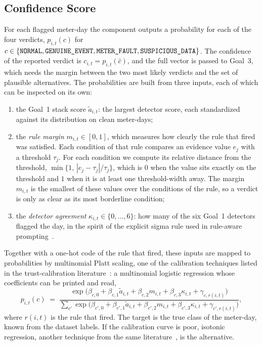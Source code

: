\subsection{Confidence Score}
\label{g2-sec:confidence}
For each flagged meter-day the component outputs a probability for each of the four verdicts,
$p_{i,t}(c)$ for $c\in\{\texttt{NORMAL},\texttt{GENUINE\_EVENT},\texttt{METER\_FAULT},\texttt{SUSPICIOUS\_DATA}\}$. The confidence of the reported verdict is
$c_{i,t}=p_{i,t}(\hat c)$, and the full vector is passed to Goal~3, which needs the margin between the two most
likely verdicts and the set of plausible alternatives. The probabilities are built from three inputs, each
of which can be inspected on its own:
\begin{enumerate}[leftmargin=*,itemsep=2pt]
  \item the Goal~1 stack score $\tilde a_{i,t}$: the largest detector score, each standardized against its
        distribution on clean meter-days;
  \item the \emph{rule margin} $m_{i,t}\in[0,1]$, which measures how clearly the rule that fired was
      satisfied. Each condition of that rule compares an evidence value $e_j$ with a threshold $\tau_j$.
      For each condition we compute its relative distance from the threshold,
      $\min\{1,\,|e_j-\tau_j|/\tau_j\}$, which is $0$ when the value sits exactly on the threshold and
      $1$ when it is at least one threshold-width away. The margin $m_{i,t}$ is the smallest of these
      values over the conditions of the rule, so a verdict is only as clear as its most borderline
      condition;
  \item the \emph{detector agreement} $\kappa_{i,t}\in\{0,\dots,6\}$: how many of the six Goal~1 detectors
        flagged the day, in the spirit of the explicit sigma rule used in rule-aware
        prompting~\cite{ruleaware}.
\end{enumerate}
Together with a one-hot code of the rule that fired, these inputs are mapped to probabilities by multinomial
Platt scaling, one of the calibration techniques listed in the trust-calibration literature~\cite{trustcal}:
a multinomial logistic regression whose coefficients can be printed and read,
\begin{equation}
  p_{i,t}(c)\;=\;\frac{\exp\bigl(\beta_{c,0}+\beta_{c,1}\tilde a_{i,t}+\beta_{c,2}m_{i,t}+\beta_{c,3}\kappa_{i,t}+\gamma_{c,r(i,t)}\bigr)}
  {\sum_{c'}\exp\bigl(\beta_{c',0}+\beta_{c',1}\tilde a_{i,t}+\beta_{c',2}m_{i,t}+\beta_{c',3}\kappa_{i,t}+\gamma_{c',r(i,t)}\bigr)},
\end{equation}
where $r(i,t)$ is the rule that fired. The target is the true class of the meter-day, known from the dataset
labels. If the calibration curve is poor, isotonic regression, another technique from the same
literature~\cite{trustcal}, is the alternative.

